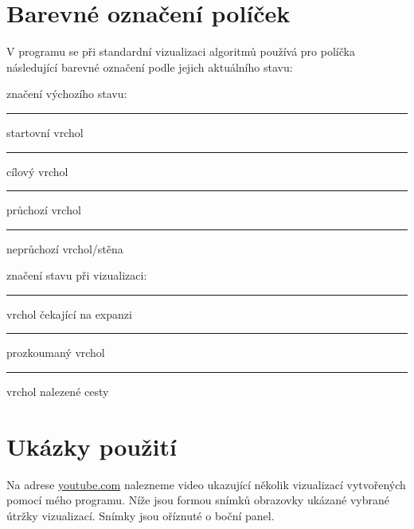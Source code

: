 \documentclass[12pt]{report}			%
\begin{document}
			\section{Barevné označení políček}
			V programu se při standardní vizualizaci algoritmů používá pro políčka následující barevné označení podle jejich aktuálního stavu: \\[1ex]
			
			\newcommand\ColorSquare[1]{{\color{#1}\rule{4mm}{4mm}}}			
			
			\begin{minipage}[outer sep=0]{\textwidth}
\begin{minipage}[t]{0.48\textwidth}
značení výchozího stavu:\\
\ColorSquare{start_colour} \quad startovní vrchol \\
			\ColorSquare{finish_colour} \quad cílový vrchol \\
			\ColorSquare{empty_colour} \quad průchozí vrchol\\
			\ColorSquare{wall_colour} \quad neprůchozí vrchol/stěna \\
    \end{minipage}\hfill
    \begin{minipage}[t]{0.48\textwidth}
    značení stavu při vizualizaci:\\
    \ColorSquare{in_frontier_colour} \quad vrchol čekající na expanzi\\ %
			\ColorSquare{visited_colour} \quad prozkoumaný vrchol\\	
			\ColorSquare{path_colour} \quad vrchol nalezené cesty
    \end{minipage}
    \end{minipage}\vspace{1ex}
						

			
			\section{Ukázky použití}
			Na adrese \url{youtube.com} nalezneme video ukazující několik vizualizací vytvořených pomocí mého programu. Níže jsou formou snímků obrazovky ukázané vybrané útržky vizualizací. Snímky jsou oříznuté o boční panel.
			
\end{document}
